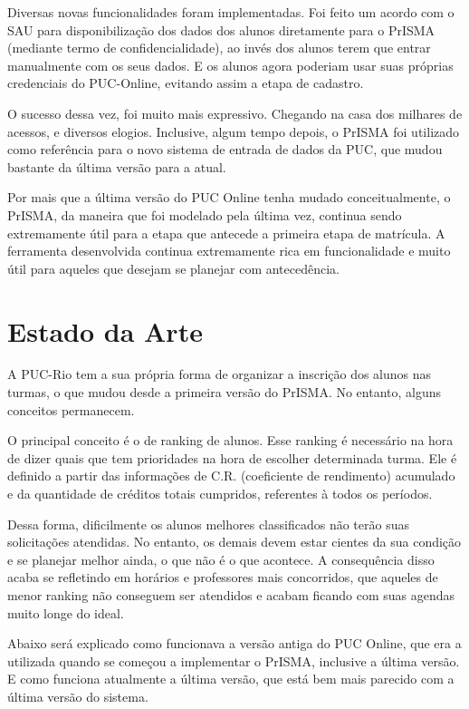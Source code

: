 \documentclass[graduacao,brazil]{ThesisPUC}
\begin{document}
Diversas novas funcionalidades foram implementadas. Foi feito um acordo com o SAU para disponibilização dos dados dos alunos diretamente para o PrISMA (mediante termo de confidencialidade), ao invés dos alunos terem que entrar manualmente com os seus dados. E os alunos agora poderiam usar suas próprias credenciais do PUC-Online, evitando assim a etapa de cadastro.

O sucesso dessa vez, foi muito mais expressivo. Chegando na casa dos milhares de acessos, e diversos elogios. Inclusive, algum tempo depois, o PrISMA foi utilizado como referência para o novo sistema de entrada de dados da PUC, que mudou bastante da última versão para a atual.

Por mais que a última versão do PUC Online tenha mudado conceitualmente, o PrISMA, da maneira que foi modelado pela última vez, continua sendo extremamente útil para a etapa que antecede a primeira etapa de matrícula. A ferramenta desenvolvida continua extremamente rica em funcionalidade e muito útil para aqueles que desejam se planejar com antecedência.


\chapter{Estado da Arte} %

A PUC-Rio tem a sua própria forma de organizar a inscrição dos alunos nas turmas, o que mudou desde a primeira versão do PrISMA. No entanto, alguns conceitos permanecem.

O principal conceito é o de ranking de alunos. Esse ranking é necessário na hora de dizer quais que tem prioridades na hora de escolher determinada turma. Ele é definido a partir das informações de C.R. (coeficiente de rendimento) acumulado e da quantidade de créditos totais cumpridos, referentes à todos os períodos.

Dessa forma, dificilmente os alunos melhores classificados não terão suas solicitações atendidas. No entanto, os demais devem estar cientes da sua condição e se planejar melhor ainda, o que não é o que acontece. A consequência disso acaba se refletindo em horários e professores mais concorridos, que aqueles de menor ranking não conseguem ser atendidos e acabam ficando com suas agendas muito longe do ideal.

Abaixo será explicado como funcionava a versão antiga do PUC Online, que era a utilizada quando se começou a implementar o PrISMA, inclusive a última versão. E como funciona atualmente a última versão, que está bem mais parecido com a última versão do sistema.
\end{document}
